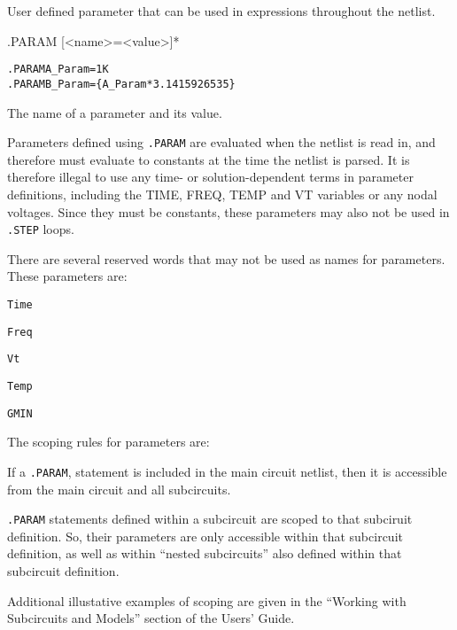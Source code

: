 



User defined parameter that can be used in expressions throughout the netlist.

\begin{Command}

\format
.PARAM [<name>=<value>]*

\examples
\begin{alltt}
.PARAM A_Param=1K
.PARAM B_Param=\{A_Param*3.1415926535\}
\end{alltt}

\arguments

\begin{Arguments}

The name of a parameter and its value.
\medskip

\end{Arguments}

\comments
Parameters defined using \verb+.PARAM+ are evaluated when the netlist is read in, and therefore must evaluate to constants at the time the netlist is parsed.  It is therefore illegal to use any time- or solution-dependent terms in parameter definitions, including the TIME, FREQ, TEMP and VT variables or any nodal voltages.   Since they must be constants, these parameters may also not be used in \texttt{.STEP} loops.

There are several reserved words that may not be used as names for parameters.  These parameters are:
\begin{XyceItemize}
\item \verb+Time+
\item \verb+Freq+ 
\item \verb+Vt+
\item \verb+Temp+
\item \verb+GMIN+
\end{XyceItemize}

The scoping rules for parameters are:
\begin{XyceItemize}
\item If a \texttt{.PARAM}, statement is included in the main circuit 
netlist, then it is accessible from the main circuit and all subcircuits. 
\item \texttt{.PARAM} statements defined within a subcircuit are scoped 
to that subciruit definition.  So, their parameters are only accessible within 
that subcircuit definition, as well as within ``nested subcircuits'' also 
defined within that subcircuit definition.
\end{XyceItemize}

Additional illustative examples of scoping are given in the
``Working with Subcircuits and Models'' section of the \Xyce{} Users' 
Guide\UsersGuide. 

\end{Command}

